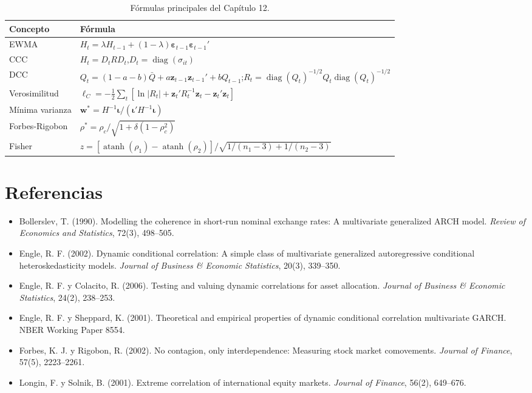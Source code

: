 \begin{table}[H]
\centering\small
\begin{tabular}{@{}ll@{}}
\toprule
Concepto & Fórmula \\
\midrule
EWMA & $H_t=\lambda H_{t-1}+(1-\lambda)\boldsymbol\varepsilon_{t-1}\boldsymbol\varepsilon_{t-1}'$ \\
CCC & $H_t=D_tRD_t$,\quad $D_t=\operatorname{diag}(\sigma_{it})$ \\
DCC & $Q_t=(1-a-b)\bar Q+a\mathbf z_{t-1}\mathbf z_{t-1}'+bQ_{t-1}$;\quad $R_t=\operatorname{diag}(Q_t)^{-1/2}Q_t\operatorname{diag}(Q_t)^{-1/2}$ \\
Verosimilitud & $\ell_C=-\frac12\sum_t[\ln|R_t|+\mathbf z_t'R_t^{-1}\mathbf z_t-\mathbf z_t'\mathbf z_t]$ \\
Mínima varianza & $\mathbf w^*=H^{-1}\boldsymbol\iota/(\boldsymbol\iota'H^{-1}\boldsymbol\iota)$ \\
Forbes-Rigobon & $\rho^*=\rho_c/\sqrt{1+\delta(1-\rho_c^2)}$ \\
Fisher & $z=[\operatorname{atanh}(\rho_1)-\operatorname{atanh}(\rho_2)]/\sqrt{1/(n_1-3)+1/(n_2-3)}$ \\
\bottomrule
\end{tabular}
\caption{Fórmulas principales del Capítulo 12.}
\end{table}

\section*{Referencias}
\begin{itemize}[leftmargin=*]
  \item Bollerslev, T. (1990). Modelling the coherence in short-run nominal exchange rates: A multivariate
        generalized ARCH model. \emph{Review of Economics and Statistics}, 72(3), 498--505.
  \item Engle, R. F. (2002). Dynamic conditional correlation: A simple class of multivariate generalized
        autoregressive conditional heteroskedasticity models. \emph{Journal of Business \& Economic Statistics},
        20(3), 339--350.
  \item Engle, R. F. y Colacito, R. (2006). Testing and valuing dynamic correlations for asset allocation.
        \emph{Journal of Business \& Economic Statistics}, 24(2), 238--253.
  \item Engle, R. F. y Sheppard, K. (2001). Theoretical and empirical properties of dynamic conditional correlation
        multivariate GARCH. NBER Working Paper 8554.
  \item Forbes, K. J. y Rigobon, R. (2002). No contagion, only interdependence: Measuring stock market
        comovements. \emph{Journal of Finance}, 57(5), 2223--2261.
  \item Longin, F. y Solnik, B. (2001). Extreme correlation of international equity markets. \emph{Journal of
        Finance}, 56(2), 649--676.
\end{itemize}
